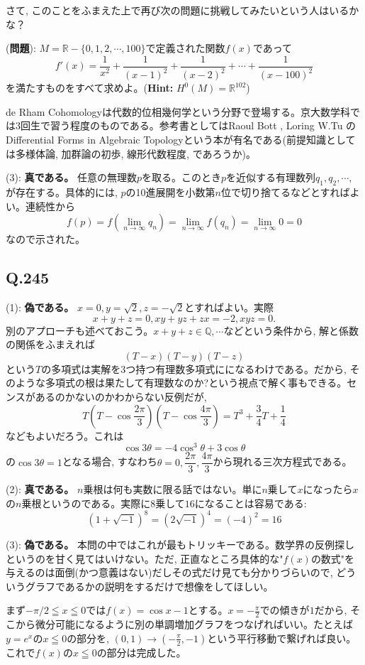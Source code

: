 \documentclass[twocolumn]{jbook}
\theoremstyle{definition}
\newcommand{\mb}{\mathbb}
\renewcommand{\leq}{\leqq}
\begin{document}
さて, このことをふまえた上で再び次の問題に挑戦してみたいという人はいるかな？

(\textbf{問題}): $M=\mb{R}-\{ 0,1,2,\cdots, 100 \}$で定義された関数$f(x)$であって
\[f'(x) = \dfrac{1}{x^2} + \dfrac{1}{(x-1)^2} + \dfrac{1}{(x-2)^2 }+ \cdots + \dfrac{1}{(x-100)^2}\]
を満たすものをすべて求めよ。(\textbf{Hint:} $H^{0}(M) = \mb{R}^{102}$)

de Rham Cohomologyは代数的位相幾何学という分野で登場する。京大数学科では3回生で習う程度のものである。参考書としてはRaoul Bott , Loring W.Tu のDifferential Forms in Algebraic Topologyという本が有名である(前提知識としては多様体論, 加群論の初歩, 線形代数程度, であろうか)。

(3): \textbf{真である。} 任意の無理数$p$を取る。このとき$p$を近似する有理数列$q_1,q_2,\cdots,$が存在する。具体的には, $p$の10進展開を小数第$n$位で切り捨てるなどとすればよい。連続性から
\[f(p) =  f(\lim_{n\to \infty}q_n) = \lim_{n\to \infty} f(q_n) = \lim_{n\to \infty} 0 = 0\]
なので示された。


\subsection{Q.245}
(1): \textbf{偽である。} $x=0, y=\sqrt{2}, z=-\sqrt{2}$とすればよい。実際
\[x+y+z = 0,  xy+yz+zx = -2, xyz = 0.\]
別のアプローチも述べておこう。$x+y+z\in \mb{Q},\cdots$などという条件から, 解と係数の関係をふまえれば
\[(T-x)(T-y)(T-z)\]
という$T$の多項式は実解を3つ持つ有理数多項式にになるわけである。だから, そのような多項式の根は果たして有理数なのか?という視点で解く事もできる。センスがあるのかないのかわからない反例だが,  
\[T(T-\cos{\dfrac{2\pi}{3}})(T-\cos{\dfrac{4\pi}{3}}) = T^3 + \dfrac{3}{4}T +\dfrac{1}{4}\]
などもよいだろう。これは
\[\cos{3\theta} = -4\cos^{3}{\theta} + 3\cos{\theta}\]
の$\cos{3\theta} = 1$となる場合, すなわち$\theta =0, \dfrac{2\pi}{3}, \dfrac{4\pi}{3}$から現れる三次方程式である。 

(2): \textbf{真である。} $n$乗根は何も実数に限る話ではない。単に$n$乗して$x$になったら$x$の$n$乗根というのである。実際に8乗して$16$になることは容易である:
\[(1+\sqrt{-1})^8 = (2\sqrt{-1})^{4} = (-4)^2  = 16\]

(3): \textbf{偽である。} 本問の中ではこれが最もトリッキーである。数学界の反例探しというのを甘く見てはいけない。ただ, 正直なところ具体的な"$f(x)$の数式"を与えるのは面倒(かつ意義はない)だしその式だけ見ても分かりづらいので, どういうグラフであるかの説明をするだけで想像をしてほしい。

まず$-\pi/2 \leq x\leq 0$では$f(x) = \cos{x} - 1$とする。$x=-\frac{\pi}{2}$での傾きが$1$だから, そこから微分可能になるように別の単調増加グラフをつなげればいい。たとえば$y=e^{x}$の$x\leq 0$の部分を, $(0,1)\to (-\frac{\pi}{2}, -1)$という平行移動で繋げれば良い。これで$f(x)$の$x\leq 0$の部分は完成した。
\end{document}
